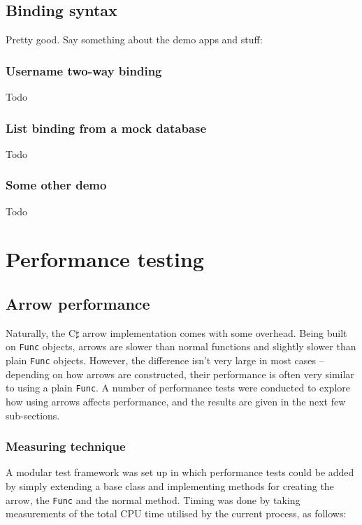 \documentclass[12pt,twoside,notitlepage]{report}
\begin{document}
\subsection{Binding syntax}

Pretty good. Say something about the demo apps and stuff:

\subsubsection{Username two-way binding}

Todo

\subsubsection{List binding from a mock database}

Todo

\subsubsection{Some other demo}

Todo

\section{Performance testing}

\subsection{Arrow performance}

Naturally, the C$\sharp$ arrow implementation comes with some overhead. Being built on \texttt{Func} objects, arrows are slower than normal functions and slightly slower than plain \texttt{Func} objects. However, the difference isn't very large in most cases -- depending on how arrows are constructed, their performance is often very similar to using a plain \texttt{Func}. A number of performance tests were conducted to explore how using arrows affects performance, and the results are given in the next few sub-sections.

\subsubsection{Measuring technique}

A modular test framework was set up in which performance tests could be added by simply extending a base class and implementing methods for creating the arrow, the \texttt{Func} and the normal method. Timing was done by taking measurements of the total CPU time utilised by the current process, as follows:
\end{document}
